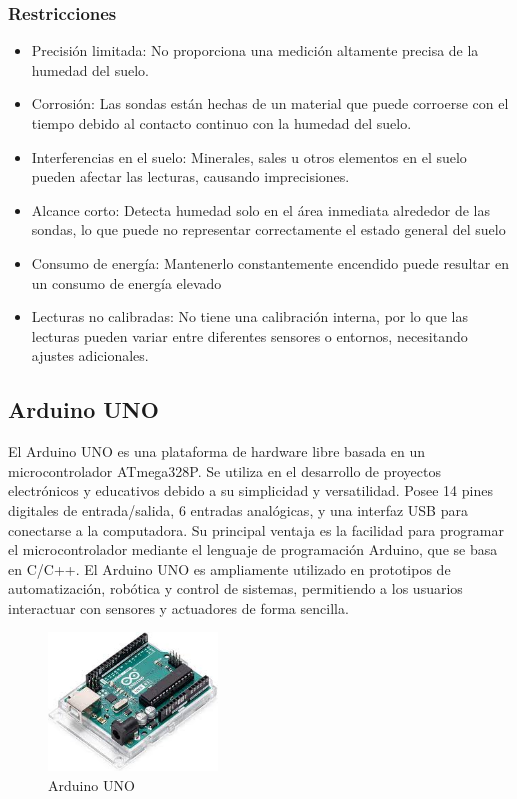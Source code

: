 \documentclass[conference]{IEEEtran}
\begin{document}
	\subsubsection{Restricciones}
	\begin{itemize}
		\item Precisión limitada: No proporciona una medición altamente precisa de la humedad del suelo. 
		\item Corrosión: Las sondas están hechas de un material que puede corroerse con el tiempo debido al contacto continuo con la humedad del suelo.
		\item Interferencias en el suelo: Minerales, sales u otros elementos en el suelo pueden afectar las lecturas, causando imprecisiones.
		\item Alcance corto: Detecta humedad solo en el área inmediata alrededor de las sondas, lo que puede no representar correctamente el estado general del suelo
		\item Consumo de energía: Mantenerlo constantemente encendido puede resultar en un consumo de energía elevado
		\item Lecturas no calibradas: No tiene una calibración interna, por lo que las lecturas pueden variar entre diferentes sensores o entornos, necesitando ajustes adicionales.
	\end{itemize}
	
	\subsection{Arduino UNO}
	El Arduino UNO es una plataforma de hardware libre basada en un microcontrolador ATmega328P. Se utiliza en el desarrollo de proyectos electrónicos y educativos debido a su simplicidad y versatilidad. Posee 14 pines digitales de entrada/salida, 6 entradas analógicas, y una interfaz USB para conectarse a la computadora. Su principal ventaja es la facilidad para programar el microcontrolador mediante el lenguaje de programación Arduino, que se basa en C/C++. El Arduino UNO es ampliamente utilizado en prototipos de automatización, robótica y control de sistemas, permitiendo a los usuarios interactuar con sensores y actuadores de forma sencilla.
	
	\begin{figure}[h]
		\centering
		\includegraphics[width=0.4\textwidth]{media/arduino-uno.jpg}
		\caption{Arduino UNO}
		\label{fig:arduino-uno}
	\end{figure}
	
\end{document}

